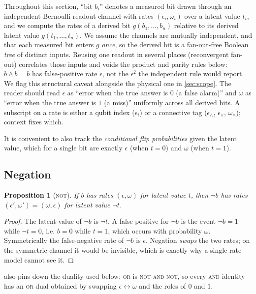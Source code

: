 \documentclass[12pt]{article}
\numberwithin{equation}{section}
\theoremstyle{plain}
\newtheorem{proposition}[theorem]{Proposition}
\theoremstyle{definition}
\theoremstyle{remark}
\newcommand{\eps}{\epsilon}
\begin{document}
Throughout this section, ``bit $b_i$'' denotes a measured bit drawn through an
independent Bernoulli readout channel with rates $(\eps_i,\omega_i)$ over a
latent value $t_i$, and we compute the rates of a derived bit
$g(b_1,\dots,b_n)$ relative to its derived latent value $g(t_1,\dots,t_n)$. We
assume the channels are mutually independent, and that each measured bit enters
$g$ \emph{once}, so the derived bit is a fan-out-free Boolean \emph{tree} of
distinct inputs. Reusing one readout in several places (reconvergent fan-out)
correlates those inputs and voids the product and parity rules below: $b\wedge b
= b$ has false-positive rate $\eps$, not the $\eps^2$ the independent rule would
report. We flag this structural caveat alongside the physical one in
\cref{sec:scope}. The reader should read $\eps$ as
``error when the true answer is $0$ (a false alarm)'' and $\omega$ as ``error
when the true answer is $1$ (a miss)'' uniformly across all derived bits. A
subscript on a rate is either a qubit index ($\eps_i$) or a connective tag
($\eps_\wedge$, $\eps_\vee$, $\omega_\wedge$); context fixes which.

It is convenient to also track the \emph{conditional flip probabilities} given
the latent value, which for a single bit are exactly $\eps$ (when $t=0$) and
$\omega$ (when $t=1$).

\subsection{Negation}

\begin{proposition}[\textsc{not}]
\label{prop:not}
If $b$ has rates $(\eps,\omega)$ for latent value $t$, then $\lnot b$ has rates
$(\eps',\omega')=(\omega,\eps)$ for latent value $\lnot t$.
\end{proposition}

\begin{proof}
The latent value of $\lnot b$ is $\lnot t$. A false positive for $\lnot b$ is the
event $\lnot b=1$ while $\lnot t=0$, i.e. $b=0$ while $t=1$, which occurs with
probability $\omega$. Symmetrically the false-negative rate of $\lnot b$ is
$\eps$. Negation \emph{swaps} the two rates; on the symmetric channel it would be
invisible, which is exactly why a single-rate model cannot see it.
\end{proof}

 also pins down the duality used below: \textsc{or} is
\textsc{not}-\textsc{and}-\textsc{not}, so every \textsc{and} identity has an
\textsc{or} dual obtained by swapping $\eps\leftrightarrow\omega$ and the roles
of $0$ and $1$.
\end{document}
